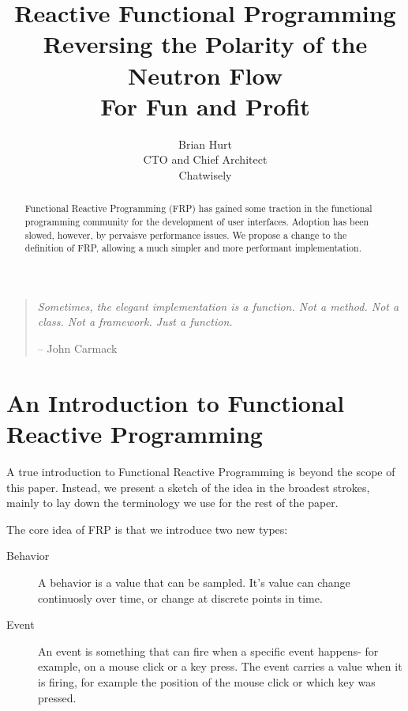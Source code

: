 \documentclass{article}
\begin{document}
\title{Reactive Functional Programming \\
{\Large Reversing the Polarity of the Neutron Flow} \\
{\large For Fun and Profit} }
\author{Brian Hurt \\
CTO and Chief Architect \\
Chatwisely}

\maketitle

\begin{quotation}
\textit{Sometimes, the elegant implementation is a function. Not a method. Not a class. Not a framework. Just a function.}
\begin{flushright}
-- John Carmack
\end{flushright}
\end{quotation}


\begin{abstract}
Functional Reactive Programming (FRP) has gained some traction in the
functional programming community for the development of user interfaces.
Adoption has been slowed, however, by pervaisve performance issues.  We
propose a change to the definition of FRP, allowing a much simpler and
more performant implementation.
\end{abstract}

\section{An Introduction to Functional Reactive Programming}

A true introduction to Functional Reactive Programming is beyond the
scope of this paper.  Instead, we present a sketch of the idea in the
broadest strokes, mainly to lay down the terminology we use for the rest
of the paper.

The core idea of FRP is that we introduce two new types:
\begin{description}
\item[Behavior] A behavior is a value that can be sampled.  It's value
can change continuosly over time, or change at discrete points in time.
\item[Event] An event is something that can fire when a specific event
happens- for example, on a mouse click or a key press.  The event
carries a value when it is firing, for example the position of the mouse
click or which key was pressed. 
\end{description}
\end{document}

